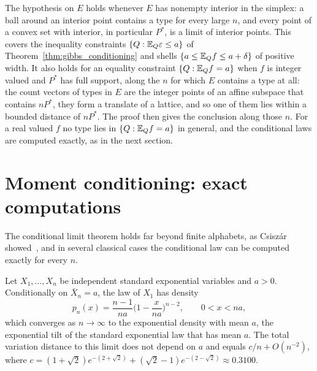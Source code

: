 The hypothesis on $E$ holds whenever $E$ has nonempty interior in the simplex: a ball around an interior point contains a type for every large $n$, and every point of a convex set with interior, in particular $P^*$, is a limit of interior points. This covers the inequality constraints $\{Q:\mathbb{E}_Q\varepsilon\leq a\}$ of Theorem~\ref{thm:gibbs_conditioning} and shells $\{a\leq\mathbb{E}_Qf\leq a+\delta\}$ of positive width. It also holds for an equality constraint $\{Q:\mathbb{E}_Qf = a\}$ when $f$ is integer valued and $P^*$ has full support, along the $n$ for which $E$ contains a type at all: the count vectors of types in $E$ are the integer points of an affine subspace that contains $nP^*$, they form a translate of a lattice, and so one of them lies within a bounded distance of $nP^*$. The proof then gives the conclusion along those $n$. For a real valued $f$ no type lies in $\{Q:\mathbb{E}_Qf = a\}$ in general, and the conditional laws are computed exactly, as in the next section.

\section{Moment conditioning: exact computations}

The conditional limit theorem holds far beyond finite alphabets, as Csisz\'ar showed~\cite{csiszar1984}, and in several classical cases the conditional law can be computed exactly for every $n$.

\begin{proposition}
\label{prop:expsamples}
Let $X_1,\dots,X_n$ be independent standard exponential variables and $a>0$. Conditionally on $\bar X_n = a$, the law of $X_1$ has density
\[
p_n(x) = \frac{n-1}{na}\Big(1-\frac{x}{na}\Big)^{n-2},\qquad0<x<na,
\]
which converges as $n\to\infty$ to the exponential density with mean $a$, the exponential tilt of the standard exponential law that has mean $a$. The total variation distance to this limit does not depend on $a$ and equals $c/n+O(n^{-2})$, where $c = (1+\sqrt2)e^{-(2+\sqrt2)}+(\sqrt2-1)e^{-(2-\sqrt2)}\approx0.3100$.
\end{proposition}

